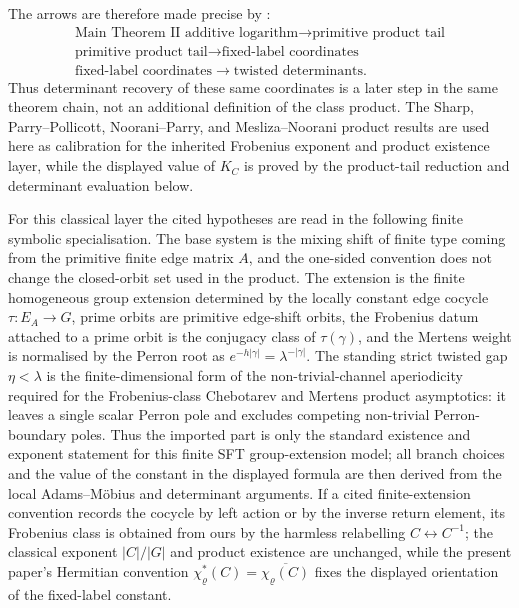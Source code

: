 \documentclass[11pt,a4paper]{amsart}
\theoremstyle{plain}
\theoremstyle{definition}
\theoremstyle{remark}
\begin{document}
The arrows are therefore made precise by
:
\[
\begin{array}{c}
\text{Main Theorem II additive logarithm}\longrightarrow\text{primitive product tail}\\[2pt]
\text{primitive product tail}\longrightarrow\text{fixed-label coordinates}\\[2pt]
\text{fixed-label coordinates}\longrightarrow\text{twisted determinants}.
\end{array}
\]
Thus determinant recovery of these same coordinates is a later step in the
same theorem chain, not an additional definition of the class product.  The
Sharp, Parry--Pollicott, Noorani--Parry, and Mesliza--Noorani product results
are used here as calibration for the inherited Frobenius exponent and product
existence layer, while the displayed value of \(K_C\) is proved by the
product-tail reduction and determinant evaluation below.

For this classical layer the cited hypotheses are read in the following finite
symbolic specialisation.  The base system is the mixing shift of finite type
coming from the primitive finite edge matrix \(A\), and the one-sided convention
does not change the closed-orbit set used in the product.  The extension is the
finite homogeneous group extension determined by the locally constant edge
cocycle \(\tau:E_A\to G\), prime orbits are primitive edge-shift orbits, the
Frobenius datum attached to a prime orbit is the conjugacy class of
\(\tau(\gamma)\), and the Mertens weight is normalised by the Perron root as
  \(e^{-h|\gamma|}=\lambda^{-|\gamma|}\).  The standing strict twisted gap
  \(\eta<\lambda\) is the finite-dimensional form of the non-trivial-channel
  aperiodicity required for the Frobenius-class Chebotarev and Mertens product
  asymptotics: it leaves a single scalar Perron pole and excludes competing
  non-trivial Perron-boundary poles.  Thus the imported part is only the standard
  existence and exponent statement for this finite SFT group-extension model;
  all branch choices and the value of the constant in the displayed formula are
  then derived from the local Adams--M\"obius and determinant arguments.
  If a cited finite-extension convention records the cocycle by left action or
  by the inverse return element, its Frobenius class is obtained from ours by
  the harmless relabelling \(C\leftrightarrow C^{-1}\); the classical exponent
  \(|C|/|G|\) and product existence are unchanged, while the present paper's
  Hermitian convention \(\chi_\varrho^\ast(C)=\overline{\chi_\varrho(C)}\)
  fixes the displayed orientation of the fixed-label constant.
\end{document}
